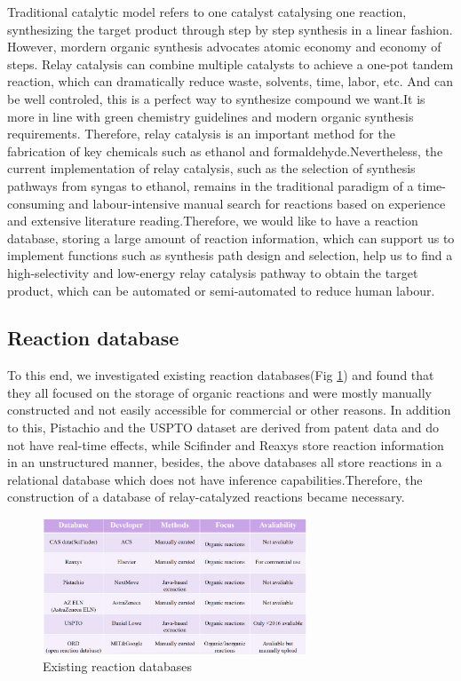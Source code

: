 \documentclass[%
 aip,
 jmp,%
 amsmath,amssymb,
 reprint,%
]{revtex4-2}
\begin{document}
Traditional catalytic model refers to one catalyst catalysing one reaction, 
synthesizing the target product through step by step synthesis in a linear fashion.
However, mordern organic synthesis advocates atomic economy and economy of steps.
Relay catalysis can combine multiple catalysts to achieve a one-pot tandem reaction,
which can dramatically reduce waste, solvents, time, labor, etc. And can be well controled, 
this is a perfect way to synthesize compound we want.It is more in line with green 
chemistry guidelines and modern organic synthesis 
requirements. Therefore, relay catalysis is an important method for the fabrication of key chemicals
such as ethanol and formaldehyde.Nevertheless, the current implementation of 
relay catalysis, such as the selection of synthesis pathways from syngas to ethanol, 
remains in the traditional paradigm of a time-consuming and labour-intensive manual 
search for reactions based on experience and extensive literature reading.Therefore, 
we would like to have a reaction database, storing a large amount of reaction information, 
which can support us to implement functions such as synthesis path design and selection, 
help us to find a high-selectivity and low-energy relay catalysis pathway to obtain the target product, 
which can be automated or semi-automated to reduce human labour.

\subsection{Reaction database}
To this end, we investigated existing reaction databases(Fig \ref{ Fig.1 }) and found that they 
all focused on the storage of organic reactions and were mostly manually constructed and not easily
accessible for commercial or other reasons.
In addition to this, Pistachio and the USPTO dataset are derived from patent data 
and do not have real-time effects, while Scifinder and Reaxys store reaction information in 
an unstructured manner, besides, the above databases all store reactions in a relational database 
which does not have inference capabilities.Therefore, the construction of a database of 
relay-catalyzed reactions became necessary.
\begin{figure}[htbp]
 \centering
 \includegraphics[width=0.7\textwidth]{figure/1.png}
 \caption{ Existing reaction databases}
 \label{ Fig.1 }
\end{figure}
\end{document}
